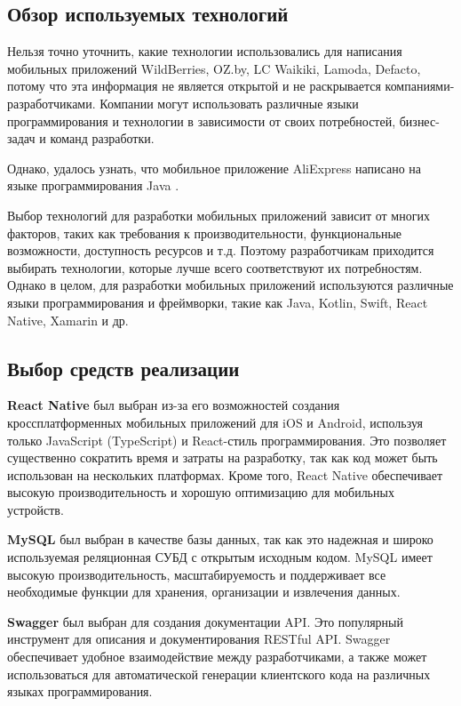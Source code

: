\subsection{Обзор используемых технологий}

Нельзя точно уточнить, какие технологии использовались для написания мобильных приложений
WildBerries, OZ.by, LC Waikiki, Lamoda, Defacto,
потому что эта информация не является открытой и не раскрывается компаниями-разработчиками.
Компании могут использовать различные языки программирования и технологии в зависимости от своих потребностей,
бизнес-задач и команд разработки.

Однако, удалось узнать, что мобильное приложение AliExpress
написано на языке программирования Java \cite{AliExpressLang} \cite{AliExpressLangForum}.

Выбор технологий для разработки мобильных приложений зависит от многих факторов,
таких как требования к производительности, функциональные возможности, доступность ресурсов и т.д.
Поэтому разработчикам приходится выбирать технологии, которые лучше всего соответствуют их потребностям.
Однако в целом, для разработки мобильных приложений используются различные языки программирования и фреймворки,
такие как Java, Kotlin, Swift, React Native, Xamarin и др.

\subsection{Выбор средств реализации}

\textbf{React Native} \cite{ReactNativeCliGuide} был выбран из-за его возможностей создания кроссплатформенных мобильных приложений для iOS и Android,
используя только JavaScript (TypeScript) и React-стиль программирования.
Это позволяет существенно сократить время и затраты на разработку, так как код может быть использован на нескольких платформах.
Кроме того, React Native обеспечивает высокую производительность и хорошую оптимизацию для мобильных устройств.

\textbf{MySQL} \cite{MySqlInNestJs} был выбран в качестве базы данных, так как это надежная и широко используемая реляционная СУБД с открытым исходным кодом.
MySQL имеет высокую производительность, масштабируемость и поддерживает все необходимые функции для хранения, организации и извлечения данных.

\textbf{Swagger} \cite{SwaggerInNestJs} был выбран для создания документации API.
Это популярный инструмент для описания и документирования RESTful API.
Swagger обеспечивает удобное взаимодействие между разработчиками,
а также может использоваться для автоматической генерации клиентского кода на различных языках программирования.

